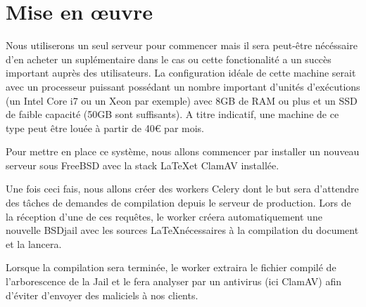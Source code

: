 \documentclass[10pt,a4paper]{article}
\begin{document}
\section{Mise en œuvre}

Nous utiliserons un seul serveur pour commencer mais il sera peut-être nécéssaire d'en acheter un suplémentaire dans le cas ou cette fonctionalité a un succès important auprès des utilisateurs.
La configuration idéale de cette machine serait avec un processeur puissant possédant un nombre important d'unités d'exécutions (un Intel Core i7 ou un Xeon par exemple) avec 8GB de RAM ou plus et un SSD de faible capacité (50GB sont suffisants).
A titre indicatif, une machine de ce type peut être louée à partir de 40€ par mois.



Pour mettre en place ce système, nous allons commencer par installer un nouveau serveur sous FreeBSD avec la stack \LaTeX et ClamAV installée.

Une fois ceci fais, nous allons créer des workers Celery dont le but sera d'attendre des tâches de demandes de compilation depuis le serveur de production.
Lors de la réception d'une de ces requêtes, le worker créera automatiquement une nouvelle BSDjail avec les sources \LaTeX nécessaires à la compilation du document et la lancera.

Lorsque la compilation sera terminée, le worker extraira le fichier compilé de l'arborescence de la Jail et le fera analyser par un antivirus (ici ClamAV) afin d'éviter d'envoyer des maliciels à nos clients.
\end{document}
